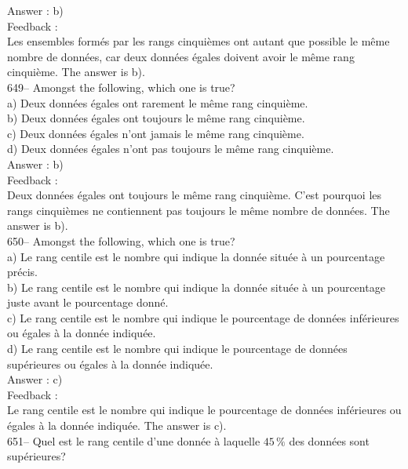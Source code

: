 \documentclass[letterpaper, 12pt]{article}
\begin{document}
Answer : b)\\

Feedback : \\
Les ensembles form\'es par les rangs cinqui\`emes ont autant que possible le
m\^eme nombre de donn\'ees, car deux donn\'ees \'egales doivent avoir le
m\^eme rang cinqui\`eme.  The answer is b).\\

649-- Amongst the following, which one is true?\\
a) Deux donn\'ees \'egales ont rarement le m\^eme rang cinqui\`eme.\\
b) Deux donn\'ees \'egales ont toujours le m\^eme rang cinqui\`eme.\\
c) Deux donn\'ees \'egales n'ont jamais le m\^eme rang cinqui\`eme.\\
d) Deux donn\'ees \'egales n'ont pas toujours le m\^eme rang cinqui\`eme.\\

Answer : b)\\

Feedback : \\
Deux donn\'ees \'egales ont toujours le m\^eme rang cinqui\`eme.  C'est
pourquoi les rangs cinqui\`emes ne contiennent pas toujours le m\^eme nombre
de donn\'ees.  The answer is b).\\

650-- Amongst the following, which one is true?\\
a) Le rang centile est le nombre qui indique la donn\'ee situ\'ee \`a un
pourcentage pr\'ecis.  \\
b) Le rang centile est le nombre qui indique la donn\'ee situ\'ee \`a un
pourcentage juste avant le pourcentage donn\'e.\\
c) Le rang centile est le nombre qui indique le pourcentage de donn\'ees
inf\'erieures ou \'egales \`a la donn\'ee indiqu\'ee. \\
d) Le rang centile est le nombre qui indique le pourcentage de donn\'ees
sup\'erieures ou \'egales \`a la donn\'ee indiqu\'ee.\\

Answer : c)\\

Feedback : \\
Le rang centile est le nombre qui indique le pourcentage de donn\'ees
inf\'erieures ou \'egales \`a la donn\'ee indiqu\'ee. The answer is c).\\

651-- Quel est le rang centile d'une donn\'ee \`a laquelle $45\,\%$ des
donn\'ees sont sup\'erieures?\\
\end{document}
